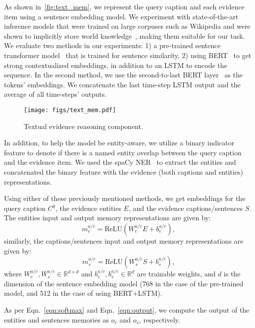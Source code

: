 As shown in~\autoref{fig:text_mem}, we represent the query caption and each evidence item using a sentence embedding model. 
We experiment with state-of-the-art inference models that were trained on large corpuses such as Wikipedia and were shown to implicitly store world knowledge~\cite{petroni2019language,lee2020language,roberts2020much}, making them suitable for our task. We evaluate two methods in our experiments: 1) a pre-trained sentence transformer model~\cite{reimers-2019-sentence-bert} that is trained for sentence similarity, 2) using BERT~\cite{devlin2019bert} to get strong contextualized embeddings, in addition to an LSTM to encode the sequence. In the second method, we use the second-to-last BERT layer~\cite{zellers2019recognition} as the tokens' embeddings. We concatenate the last time-step LSTM output and the average of all time-steps' outputs.
\begin{figure}[!t]
\centering
\texttt{[image: figs/text\_mem.pdf]}
\caption{Textual evidence reasoning component.} 
\label{fig:text_mem}
\vspace{-2mm}
\end{figure}

In addition, to help the model be entity-aware, we utilize a binary indicator feature to denote if there is a named entity overlap between the query caption and the evidence item. We used the spaCy NER~\cite{honnibal2017spacy} to extract the entities and concatenated the binary feature with the evidence (both captions and entities) representations. 

Using either of these previously mentioned methods, we get embeddings for the query caption $C^q$, the evidence entities $E$, and the evidence captions/sentences $S$. The entities input and output memory representations are given by: 
\begin{equation}
m_e^{a/c} = \text{ReLU}(W_e^{a/c}E+b_e^{a/c}),
\end{equation}
similarly, the captions/sentences input and output memory representations are given by: 
\begin{equation}
m_s^{a/c} = \text{ReLU}(W_s^{a/c}S+b_s^{a/c}),
\end{equation}
where $W_e^{a/c},W_s^{a/c}\in\mathbb{R}^{d\times d}$ and $b_e^{a/c},b_s^{a/c}\in\mathbb{R}^{d}$ are trainable weights, and $d$ is the dimension of the sentence embedding model (768 in the case of the pre-trained model, and 512 in the case of using BERT+LSTM).

As per Eqn.~\ref{eqn:softmax} and Eqn.~\ref{eqn:output}, we compute the output of the entities and sentences memories as $o_e$ and $o_s$, respectively. 


